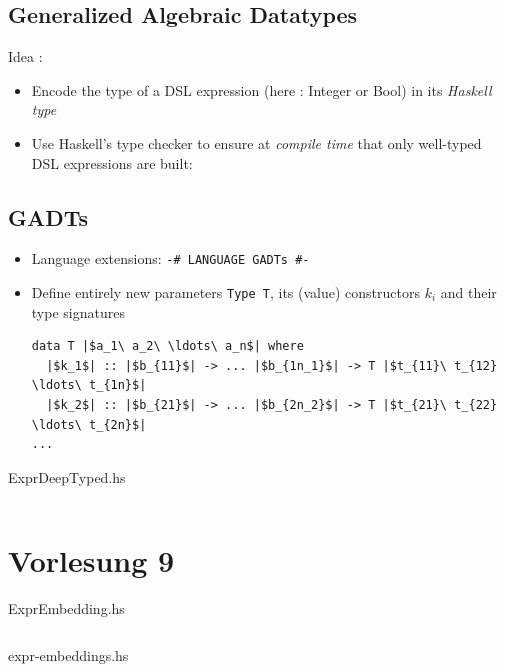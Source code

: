 \documentclass{article}
\newcommand{\Haskell}[1]{\texttt{#1}}
\begin{document}
\subsection{Generalized Algebraic Datatypes}
Idea :
\begin{itemize}
\item Encode the type of a DSL expression (here : Integer or Bool) in its \emph{Haskell type}
\item Use Haskell's type checker to ensure at \emph{compile time} that only well-typed DSL expressions are built:
\end{itemize}
\subsection{GADTs}
\begin{itemize}
\item Language extensions: \Haskell{{-# LANGUAGE GADTs #-}}
\item Define entirely new parameters \Haskell{Type T}, its (value) constructors $k_i$ and their type signatures
\begin{verbatim}
data T |$a_1\ a_2\ \ldots\ a_n$| where
  |$k_1$| :: |$b_{11}$| -> ... |$b_{1n_1}$| -> T |$t_{11}\ t_{12} \ldots\ t_{1n}$|
  |$k_2$| :: |$b_{21}$| -> ... |$b_{2n_2}$| -> T |$t_{21}\ t_{22} \ldots\ t_{2n}$|
...
\end{verbatim}
\end{itemize}
\begin{listing}[h!]
\caption{ExprDeepTyped.hs}
\inputminted{Haskell}{ExprDeepTyped.hs}
\end{listing}
\clearpage
\section{Vorlesung 9}
\begin{listing}[h!]
\caption{ExprEmbedding.hs}
\inputminted{Haskell}{ExprEmbedding.hs}
\end{listing}
\begin{listing}
\caption{expr-embeddings.hs}
\inputminted{Haskell}{expr-embeddings.hs}
\end{listing}
\end{document}
